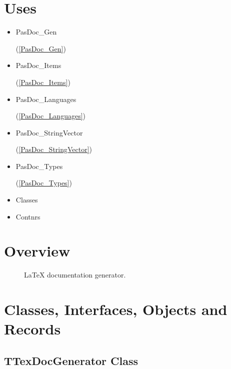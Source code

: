 \documentclass{report}
\newif\ifpdf
\begin{document}
\section{Uses}
\begin{itemize}
\item \begin{ttfamily}PasDoc{\_}Gen\end{ttfamily}(\ref{PasDoc_Gen})\item \begin{ttfamily}PasDoc{\_}Items\end{ttfamily}(\ref{PasDoc_Items})\item \begin{ttfamily}PasDoc{\_}Languages\end{ttfamily}(\ref{PasDoc_Languages})\item \begin{ttfamily}PasDoc{\_}StringVector\end{ttfamily}(\ref{PasDoc_StringVector})\item \begin{ttfamily}PasDoc{\_}Types\end{ttfamily}(\ref{PasDoc_Types})\item \begin{ttfamily}Classes\end{ttfamily}\item \begin{ttfamily}Contnrs\end{ttfamily}\end{itemize}
\section{Overview}
\begin{description}
\item[\texttt{\begin{ttfamily}TTexDocGenerator\end{ttfamily} Class}]LaTeX documentation generator.
\end{description}
\section{Classes, Interfaces, Objects and Records}
\ifpdf
\subsection*{\large{\textbf{TTexDocGenerator Class}}\normalsize\hspace{1ex}\hrulefill}
\else
\end{document}
